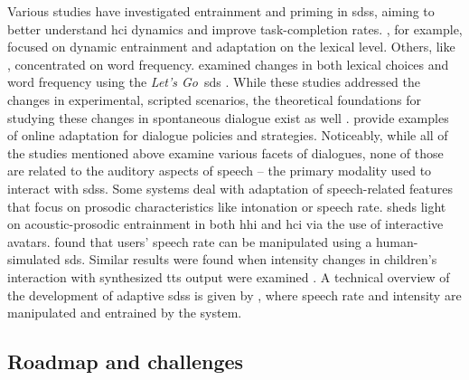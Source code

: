 Various studies have investigated entrainment and priming in \acp{sds}, aiming to better understand \ac{hci} dynamics and improve task-completion rates.
\citet{Lopes2013automated, Lopes2011primes}, for example, focused on dynamic entrainment and adaptation on the lexical level.
Others, like \citet{Nenkova2008high}, concentrated on word frequency.
\citet{Parent2010lexical} examined changes in both lexical choices and word frequency using the \emph{Let's Go}~\ac{sds} \citep{Raux2005letsgo}.
While these studies addressed the changes in experimental, scripted scenarios, the theoretical foundations for studying these changes in spontaneous dialogue exist as well \citep{Brennan1996lexical}.
\citet{Gasic2013policy, Levin2000stochastic} provide examples of online adaptation for dialogue policies and strategies.
Noticeably, while all of the studies mentioned above examine various facets of dialogues, none of those are related to the auditory aspects of speech -- the primary modality used to interact with \acp{sds}.
Some systems deal with adaptation of speech-related features that focus on prosodic characteristics like intonation or speech rate.
\citet{Levitan2014acoustic} sheds light on acoustic-prosodic entrainment in both \ac{hhi} and \ac{hci} via the use of interactive avatars.
\citet{Bell2003prosodic} found that users' speech rate can be manipulated using a human-simulated \ac{sds}.
Similar results were found when intensity changes in children's interaction with synthesized \ac{tts} output were examined \citep{Coulston2002amplitude}.
A technical overview of the development of adaptive \acp{sds} is given by \citet{Levitan2016implementing}, where speech rate and intensity are manipulated and entrained by the system.

\subsection{Roadmap and challenges}
\label{subsec:roadmap_and_challenges}

